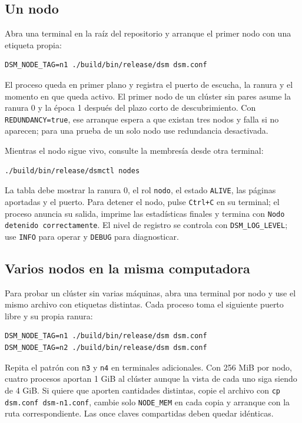 \subsection{Un nodo}\label{subsec:un-nodo}

Abra una terminal en la raíz del repositorio y arranque el primer nodo con una etiqueta propia:

\begin{lstlisting}
DSM_NODE_TAG=n1 ./build/bin/release/dsm dsm.conf
\end{lstlisting}

El proceso queda en primer plano y registra el puerto de escucha, la ranura y el momento en que queda activo. El primer nodo de un clúster sin pares asume la ranura 0 y la época 1 después del plazo corto de descubrimiento. Con \texttt{REDUNDANCY=true}, ese arranque espera a que existan tres nodos y falla si no aparecen; para una prueba de un solo nodo use redundancia desactivada.

Mientras el nodo sigue vivo, consulte la membresía desde otra terminal:

\begin{lstlisting}
./build/bin/release/dsmctl nodes
\end{lstlisting}

La tabla debe mostrar la ranura 0, el rol \texttt{nodo}, el estado \texttt{ALIVE}, las páginas aportadas y el puerto. Para detener el nodo, pulse \texttt{Ctrl+C} en su terminal; el proceso anuncia su salida, imprime las estadísticas finales y termina con \texttt{Nodo detenido correctamente}. El nivel de registro se controla con \texttt{DSM\_LOG\_LEVEL}; use \texttt{INFO} para operar y \texttt{DEBUG} para diagnosticar.

\subsection{Varios nodos en la misma computadora}\label{subsec:nodos-locales}

Para probar un clúster sin varias máquinas, abra una terminal por nodo y use el mismo archivo con etiquetas distintas. Cada proceso toma el siguiente puerto libre y su propia ranura:

\begin{lstlisting}
DSM_NODE_TAG=n1 ./build/bin/release/dsm dsm.conf
DSM_NODE_TAG=n2 ./build/bin/release/dsm dsm.conf
\end{lstlisting}

Repita el patrón con \texttt{n3} y \texttt{n4} en terminales adicionales. Con 256 MiB por nodo, cuatro procesos aportan 1 GiB al clúster aunque la vista de cada uno siga siendo de 4 GiB. Si quiere que aporten cantidades distintas, copie el archivo con \texttt{cp dsm.conf dsm-n1.conf}, cambie solo \texttt{NODE\_MEM} en cada copia y arranque con la ruta correspondiente. Las once claves compartidas deben quedar idénticas.

